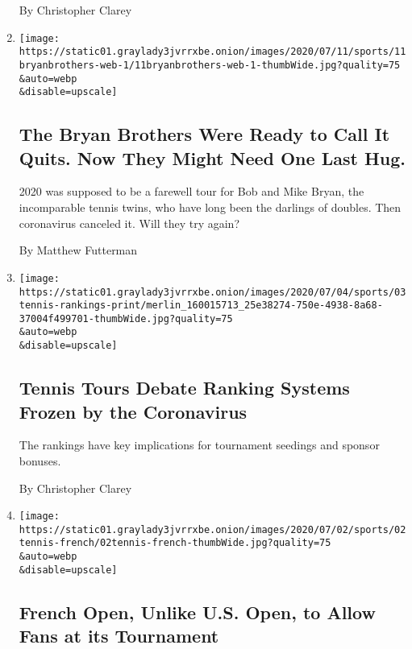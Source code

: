 \begin{enumerate}
  By Christopher Clarey
\item
  \href{/2020/07/11/sports/tennis/Bryan-brothers.html}{}

  \texttt{[image: https://static01.graylady3jvrrxbe.onion/images/2020/07/11/sports/11bryanbrothers-web-1/11bryanbrothers-web-1-thumbWide.jpg?quality=75\\\&auto=webp\\\&disable=upscale]}

  \hypertarget{the-bryan-brothers-were-ready-to-call-it-quits-now-they-might-need-one-last-hug}{%
  \subsection{The Bryan Brothers Were Ready to Call It Quits. Now They
  Might Need One Last
  Hug.}\label{the-bryan-brothers-were-ready-to-call-it-quits-now-they-might-need-one-last-hug}}

  2020 was supposed to be a farewell tour for Bob and Mike Bryan, the
  incomparable tennis twins, who have long been the darlings of doubles.
  Then coronavirus canceled it. Will they try again?

  By Matthew Futterman
\item
  \href{/2020/07/04/sports/tennis/tennis-rankings-coronavirus.html}{}

  \texttt{[image: https://static01.graylady3jvrrxbe.onion/images/2020/07/04/sports/03tennis-rankings-print/merlin\_160015713\_25e38274-750e-4938-8a68-37004f499701-thumbWide.jpg?quality=75\\\&auto=webp\\\&disable=upscale]}

  \hypertarget{tennis-tours-debate-ranking-systems-frozen-by-the-coronavirus}{%
  \subsection{Tennis Tours Debate Ranking Systems Frozen by the
  Coronavirus}\label{tennis-tours-debate-ranking-systems-frozen-by-the-coronavirus}}

  The rankings have key implications for tournament seedings and sponsor
  bonuses.

  By Christopher Clarey
\item
  \href{/2020/07/02/sports/tennis/french-open-fans.html}{}

  \texttt{[image: https://static01.graylady3jvrrxbe.onion/images/2020/07/02/sports/02tennis-french/02tennis-french-thumbWide.jpg?quality=75\\\&auto=webp\\\&disable=upscale]}

  \hypertarget{french-open-unlike-us-open-to-allow-fans-at-its-tournament}{%
  \subsection{French Open, Unlike U.S. Open, to Allow Fans at its
  Tournament}\label{french-open-unlike-us-open-to-allow-fans-at-its-tournament}}


\end{enumerate}

